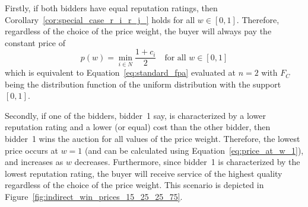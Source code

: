 Firstly, if both bidders have equal reputation ratings, then Corollary~\ref{cor:special_case_r_i_r_j_} holds for all $w\in [0,1]$. Therefore, regardless of the choice of the price weight, the buyer will always pay the constant price of
\begin{equation}
  \label{eq:price_at_w_1}
  p(w) = \min_{i\in N} \frac{1+c_i}{2} \quad\text{for all }w\in [0,1]
\end{equation}
which is equivalent to Equation~\eqref{eq:standard_fpa} evaluated at $n=2$ with $F_C$ being the distribution function of the uniform distribution with the support $[0,1]$.

Secondly, if one of the bidders, bidder~1 say, is characterized by a lower reputation rating and a lower (or equal) cost than the other bidder, then bidder~1 wins the auction for all values of the price weight. Therefore, the lowest price occurs at $w=1$ (and can be calculated using Equation~\eqref{eq:price_at_w_1}), and increases as $w$ decreases. Furthermore, since bidder~1 is characterized by the lowest reputation rating, the buyer will receive service of the highest quality regardless of the choice of the price weight. This scenario is depicted in Figure~\ref{fig:indirect_win_prices_15_25_25_75}.

